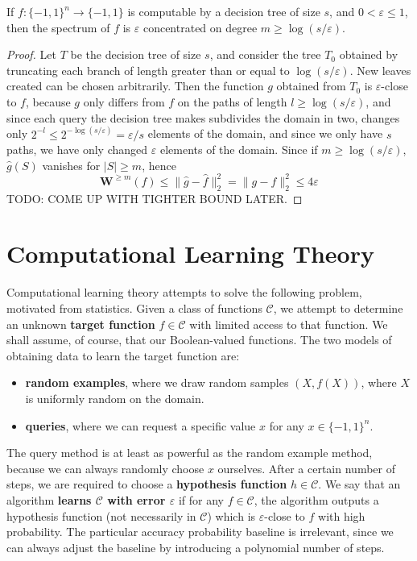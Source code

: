 \begin{theorem}
    If $f: \{ -1, 1 \}^n \to \{ -1, 1 \}$ is computable by a decision tree of size $s$, and $0 < \varepsilon \leq 1$, then the spectrum of $f$ is $\varepsilon$ concentrated on degree $m \geq \log(s/\varepsilon)$.
\end{theorem}
\begin{proof}
    Let $T$ be the decision tree of size $s$, and consider the tree $T_0$ obtained by truncating each branch of length greater than or equal to $\log(s/\varepsilon)$. New leaves created can be chosen arbitrarily. Then the function $g$ obtained from $T_0$ is $\varepsilon$-close to $f$, because $g$ only differs from $f$ on the paths of length $l \geq \log(s/\varepsilon)$, and since each query the decision tree makes subdivides the domain in two, changes only $2^{-l} \leq 2^{-\log(s/\varepsilon)} = \varepsilon/s$ elements of the domain, and since we only have $s$ paths, we have only changed $\varepsilon$ elements of the domain. Since if $m \geq \log(s/\varepsilon)$, $\widehat{g}(S)$ vanishes for $|S| \geq m$, hence
    \[ \mathbf{W}^{\geq m}(f) \leq \| \widehat{g} - \widehat{f} \|_2^2 = \| g - f \|_2^2 \leq 4 \varepsilon \]
    TODO: COME UP WITH TIGHTER BOUND LATER.
\end{proof}




\section{Computational Learning Theory}

Computational learning theory attempts to solve the following problem, motivated from statistics. Given a class of functions $\mathcal{C}$, we attempt to determine an unknown {\bf target function} $f \in \mathcal{C}$ with limited access to that function. We shall assume, of course, that our Boolean-valued functions. The two models of obtaining data to learn the target function are:
%
\begin{itemize}
    \item {\bf random examples}, where we draw random samples $(X,f(X))$, where $X$ is uniformly random on the domain.
    \item {\bf queries}, where we can request a specific value $x$ for any $x \in \{ -1, 1 \}^n$.
\end{itemize}
%
The query method is at least as powerful as the random example method, because we can always randomly choose $x$ ourselves. After a certain number of steps, we are required to choose a {\bf hypothesis function} $h \in \mathcal{C}$. We say that an algorithm {\bf learns $\mathcal{C}$ with error $\varepsilon$} if for any $f \in \mathcal{C}$, the algorithm outputs a hypothesis function (not necessarily in $\mathcal{C}$) which is $\varepsilon$-close to $f$ with high probability. The particular accuracy probability baseline is irrelevant, since we can always adjust the baseline by introducing a polynomial number of steps.

